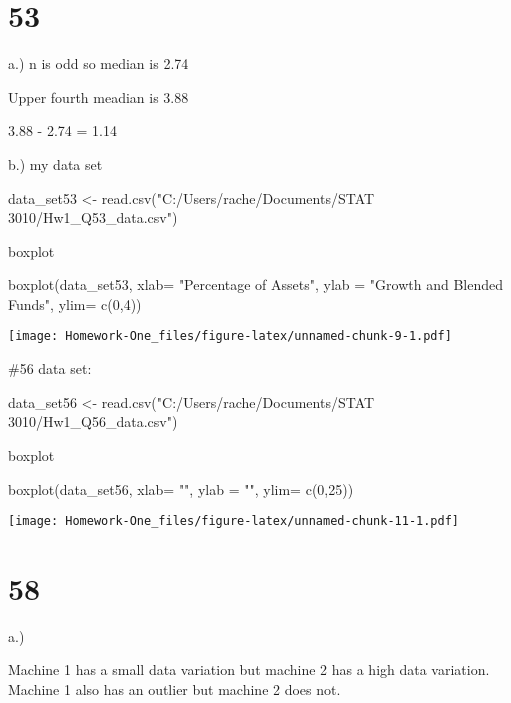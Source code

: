 \documentclass[
]{article}
\newenvironment{Shaded}{\begin{snugshade}}{\end{snugshade}}
\newcommand{\AttributeTok}[1]{\textcolor[rgb]{0.77,0.63,0.00}{#1}}
\newcommand{\DecValTok}[1]{\textcolor[rgb]{0.00,0.00,0.81}{#1}}
\newcommand{\FunctionTok}[1]{\textcolor[rgb]{0.00,0.00,0.00}{#1}}
\newcommand{\NormalTok}[1]{#1}
\newcommand{\OtherTok}[1]{\textcolor[rgb]{0.56,0.35,0.01}{#1}}
\newcommand{\StringTok}[1]{\textcolor[rgb]{0.31,0.60,0.02}{#1}}
\begin{document}
\hypertarget{section-4}{%
\section{53}\label{section-4}}

a.) n is odd so median is 2.74

Upper fourth meadian is 3.88

3.88 - 2.74 = 1.14

b.) my data set

\begin{Shaded}
\begin{Highlighting}[]
\NormalTok{data\_set53 }\OtherTok{\textless{}{-}} \FunctionTok{read.csv}\NormalTok{(}\StringTok{"C:/Users/rache/Documents/STAT 3010/Hw1\_Q53\_data.csv"}\NormalTok{)}
\end{Highlighting}
\end{Shaded}

boxplot

\begin{Shaded}
\begin{Highlighting}[]
\FunctionTok{boxplot}\NormalTok{(data\_set53, }\AttributeTok{xlab=} \StringTok{"Percentage of Assets"}\NormalTok{, }\AttributeTok{ylab =} \StringTok{"Growth and Blended Funds"}\NormalTok{, }\AttributeTok{ylim=} \FunctionTok{c}\NormalTok{(}\DecValTok{0}\NormalTok{,}\DecValTok{4}\NormalTok{))}
\end{Highlighting}
\end{Shaded}

\texttt{[image: Homework-One\_files/figure-latex/unnamed-chunk-9-1.pdf]}

\#56 data set:

\begin{Shaded}
\begin{Highlighting}[]
\NormalTok{data\_set56 }\OtherTok{\textless{}{-}} \FunctionTok{read.csv}\NormalTok{(}\StringTok{"C:/Users/rache/Documents/STAT 3010/Hw1\_Q56\_data.csv"}\NormalTok{)}
\end{Highlighting}
\end{Shaded}

boxplot

\begin{Shaded}
\begin{Highlighting}[]
\FunctionTok{boxplot}\NormalTok{(data\_set56, }\AttributeTok{xlab=} \StringTok{""}\NormalTok{, }\AttributeTok{ylab =} \StringTok{""}\NormalTok{, }\AttributeTok{ylim=} \FunctionTok{c}\NormalTok{(}\DecValTok{0}\NormalTok{,}\DecValTok{25}\NormalTok{))}
\end{Highlighting}
\end{Shaded}

\texttt{[image: Homework-One\_files/figure-latex/unnamed-chunk-11-1.pdf]}

\hypertarget{section-5}{%
\section{58}\label{section-5}}

a.)

Machine 1 has a small data variation but machine 2 has a high data
variation. Machine 1 also has an outlier but machine 2 does not.
\end{document}

